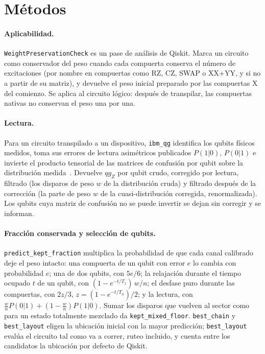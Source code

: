 \documentclass[11pt]{article}
\newcommand{\qZ}{qg_Z}
\begin{document}
\section{Métodos}

\paragraph{Aplicabilidad.} \texttt{WeightPreservationCheck} es un pase de análisis de Qiskit. Marca un
circuito como conservador del peso cuando cada compuerta conserva el número de excitaciones (por nombre en
compuertas como RZ, CZ, SWAP o XX+YY, y si no a partir de su matriz), y devuelve el peso inicial preparado
por las compuertas X del comienzo. Se aplica al circuito lógico: después de transpilar, las compuertas
nativas no conservan el peso una por una.

\paragraph{Lectura.} Para un circuito transpilado a un dispositivo, \texttt{ibm\_qg} identifica los qubits
físicos medidos, toma sus errores de lectura asimétricos publicados $P(1|0)$, $P(0|1)$ e invierte el
producto tensorial de las matrices de confusión por qubit sobre la distribución medida~\cite{bravyi2021readout}.
Devuelve $\qZ$ por qubit crudo, corregido por lectura, filtrado (los disparos de peso $w$ de la distribución
cruda) y filtrado después de la corrección (la parte de peso $w$ de la cuasi-distribución corregida,
renormalizada). Los qubits cuya matriz de confusión no se puede invertir se dejan sin corregir y se
informan.

\paragraph{Fracción conservada y selección de qubits.} \texttt{predict\_kept\_fraction} multiplica la
probabilidad de que cada canal calibrado deje el peso intacto: una compuerta de un qubit con error $e$ lo
cambia con probabilidad $e$; una de dos qubits, con $5e/6$; la relajación durante el tiempo ocupado $t$ de
un qubit, con $(1-e^{-t/T_1})\,w/n$; el desfase puro durante las compuertas, con $2z/3$,
$z=(1-e^{-t/T_\phi})/2$; y la lectura, con $\tfrac{w}{n}P(0|1)+(1-\tfrac{w}{n})P(1|0)$. Sumar los disparos
que vuelven al sector como para un estado totalmente mezclado da \texttt{kept\_mixed\_floor}.
\texttt{best\_chain} y \texttt{best\_layout} eligen la ubicación inicial con la mayor predicción;
\texttt{best\_layout} evalúa el circuito tal como va a correr, ruteo incluido, y cuenta entre los candidatos
la ubicación por defecto de Qiskit.
\end{document}

